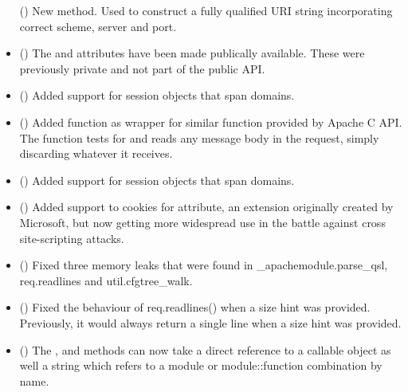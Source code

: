 \begin{itemize}
      ()
      New  method. Used to construct a fully
      qualified URI string incorporating correct scheme, server and port.
    \item
      ()
      The  and  attributes
      have been made publically available. These were previously private and
      not part of the public API.
    \item
      ()
      Added support for session objects that span domains.
    \item
      ()
      Added  function as wrapper for
      similar function provided by Apache C API. The function tests for
      and reads any message body in the request, simply discarding
      whatever it receives.
    \item
      ()
      Added support for session objects that span domains.
    \item
      ()
      Added support to cookies for  attribute, an extension
      originally created by Microsoft, but now getting more widespread use
      in the battle against cross site-scripting attacks.
    \item
      ()
      Fixed three memory leaks that were found in _apachemodule.parse_qsl, req.readlines
      and util.cfgtree_walk.
    \item
      ()
      Fixed the behaviour of req.readlines() when a size hint was provided. Previously,
      it would always return a single line when a size hint was provided.
    \item
      ()
      The ,  and
       methods can now take a direct
      reference to a callable object as well a string which refers to a
      module or module::function combination by name.

\end{itemize}
